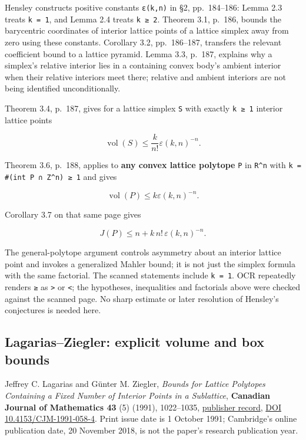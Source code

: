 \documentclass[11pt,a4paper,oneside]{report}
\begin{document}
Hensley constructs positive constants
\texttt{ε(\allowbreak{}k,\allowbreak{}n)} in §2, pp.~184--186: Lemma 2.3
treats \texttt{k =\allowbreak{} 1}, and Lemma 2.4 treats \texttt{k ≥ 2}.
Theorem 3.1, p.~186, bounds the barycentric coordinates of interior
lattice points of a lattice simplex away from zero using these
constants. Corollary 3.2, pp.~186--187, transfers the relevant
coefficient bound to a lattice pyramid. Lemma 3.3, p.~187, explains why
a simplex's relative interior lies in a containing convex body's ambient
interior when their relative interiors meet there; relative and ambient
interiors are not being identified unconditionally.

Theorem 3.4, p.~187, gives for a lattice simplex \texttt{S} with exactly
\texttt{k ≥ 1} interior lattice points

\[
\operatorname{vol}(S)\le \frac{k}{n!}\varepsilon(k,n)^{-n}.
\]

Theorem 3.6, p.~188, applies to \textbf{any convex lattice polytope}
\texttt{P} in \texttt{R\textasciicircum{}n} with
\texttt{k =\allowbreak{} \#(\allowbreak{}int P ∩ Z\textasciicircum{}n)\allowbreak{} ≥ 1}
and gives

\[
\operatorname{vol}(P)\le k\varepsilon(k,n)^{-n}.
\]

Corollary 3.7 on that same page gives

\[
J(P)\le n+k\,n!\,\varepsilon(k,n)^{-n}.
\]

The general-polytope argument controls asymmetry about an interior
lattice point and invokes a generalized Mahler bound; it is not just the
simplex formula with the same factorial. The scanned statements include
\texttt{k =\allowbreak{} 1}. OCR repeatedly renders \texttt{≥} as
\texttt{>} or \texttt{<}; the hypotheses, inequalities and factorials
above were checked against the scanned page. No sharp estimate or later
resolution of Hensley's conjectures is needed here.

\subsection{Lagarias--Ziegler: explicit volume and box
bounds}\label{finiteness-and-box-reduction--lagariasziegler-explicit-volume-and-box-bounds}

Jeffrey C. Lagarias and Günter M. Ziegler, \emph{Bounds for Lattice
Polytopes Containing a Fixed Number of Interior Points in a Sublattice},
\textbf{Canadian Journal of Mathematics 43} (5) (1991), 1022--1035,
\href{https://www.cambridge.org/core/journals/canadian-journal-of-mathematics/article/bounds-for-lattice-polytopes-containing-a-fixed-number-of-interior-points-in-a-sublattice/0D4E5B45AB64DC6069A9BD7DD45B450C}{publisher
record}, \href{https://doi.org/10.4153/CJM-1991-058-4}{DOI
10.\allowbreak{}4153/\allowbreak{}CJM-\allowbreak{}1991-\allowbreak{}058-\allowbreak{}4}.
Print issue date is 1 October 1991; Cambridge's online publication date,
20 November 2018, is not the paper's research publication year.
\end{document}
